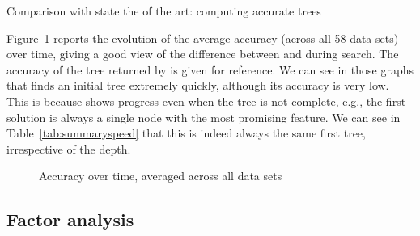 \documentclass{article}
\begin{document}



\begin{table}[htbp]
\begin{center}
\begin{footnotesize}
\tabcolsep=5pt

\end{footnotesize}
\end{center}
\caption{\label{tab:summaryspeed} Comparison with state the of the art: computing accurate trees}
\end{table}


Figure~\ref{fig:cactus} reports the evolution of the average accuracy (across all 58 data sets) over time, giving a good view of the difference between \murtree and \budalg during search. The accuracy of the tree returned by \cart is given for reference. 
We can see in those graphs that \murtree finds an initial tree extremely quickly, although its accuracy is very low. This is because \murtree shows progress even when the tree is not complete, e.g., the first solution is always a single node with the most promising feature. We can see in Table~\ref{tab:summaryspeed} that this is indeed always the same first tree, irrespective of the depth.



\begin{figure}
	\subfloat[depth=3]{}
	\subfloat[depth=7]{}
	\subfloat[depth=10]{}
	\caption{\label{fig:cactus}Accuracy over time, averaged across all data sets}
\end{figure}


\subsection{Factor analysis}
\end{document}
